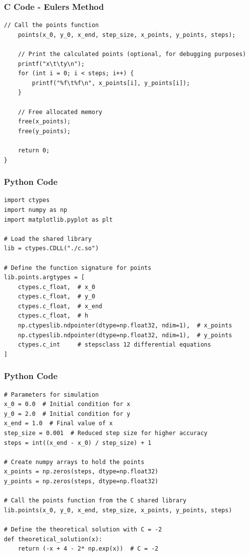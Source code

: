 \documentclass{beamer}
\begin{document}
\begin{frame}[fragile]
    \frametitle{C Code - Eulers Method}
    \begin{lstlisting}
// Call the points function
    points(x_0, y_0, x_end, step_size, x_points, y_points, steps);

    // Print the calculated points (optional, for debugging purposes)
    printf("x\t\ty\n");
    for (int i = 0; i < steps; i++) {
        printf("%f\t%f\n", x_points[i], y_points[i]);
    }

    // Free allocated memory
    free(x_points);
    free(y_points);

    return 0;
}
    \end{lstlisting}
\end{frame}

\begin{frame}[fragile]
    \frametitle{Python Code}
    \begin{lstlisting}
import ctypes
import numpy as np
import matplotlib.pyplot as plt

# Load the shared library
lib = ctypes.CDLL("./c.so")

# Define the function signature for points
lib.points.argtypes = [
    ctypes.c_float,  # x_0
    ctypes.c_float,  # y_0
    ctypes.c_float,  # x_end
    ctypes.c_float,  # h
    np.ctypeslib.ndpointer(dtype=np.float32, ndim=1),  # x_points
    np.ctypeslib.ndpointer(dtype=np.float32, ndim=1),  # y_points
    ctypes.c_int     # stepsclass 12 differential equations
]

    \end{lstlisting}
\end{frame}

\begin{frame}[fragile]
    \frametitle{Python Code}
    \begin{lstlisting}
# Parameters for simulation
x_0 = 0.0  # Initial condition for x
y_0 = 2.0  # Initial condition for y
x_end = 1.0  # Final value of x
step_size = 0.001  # Reduced step size for higher accuracy
steps = int((x_end - x_0) / step_size) + 1

# Create numpy arrays to hold the points
x_points = np.zeros(steps, dtype=np.float32)
y_points = np.zeros(steps, dtype=np.float32)

# Call the points function from the C shared library
lib.points(x_0, y_0, x_end, step_size, x_points, y_points, steps)

# Define the theoretical solution with C = -2
def theoretical_solution(x):
    return (-x + 4 - 2* np.exp(x))  # C = -2
    \end{lstlisting}
\end{frame}
\end{document}
